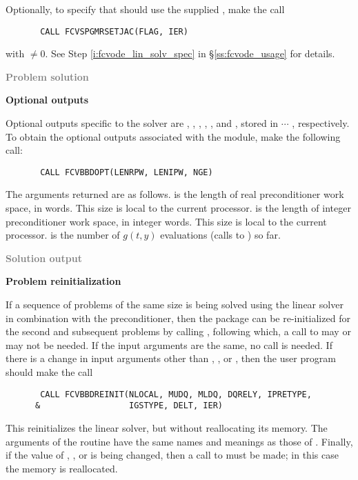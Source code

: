 \begin{Steps}
  Optionally, to specify that {\spgmr} should use the supplied , 
  make the call
\begin{verbatim}
       CALL FCVSPGMRSETJAC(FLAG, IER)
\end{verbatim}
  with $\neq 0$. See Step \ref{i:fcvode_lin_solv_spec} in 
  \S\ref{ss:fcvode_usage} for details.
  
\item \textcolor{gray}{\bf Problem solution}
  
\item {\bf {\cvbbdpre} Optional outputs}
  
  Optional outputs specific to the {\spgmr} solver are , , , 
  , , and , stored in  $\cdots$ , 
  respectively.
  To obtain the optional outputs associated with the {\cvbbdpre} module, make
  the following call:
\begin{verbatim}
       CALL FCVBBDOPT(LENRPW, LENIPW, NGE)
\end{verbatim}
  The arguments returned are as follows.
   is the length of real preconditioner work space, in  words.
  This size is local to the current processor.
   is the length of integer preconditioner work space, in integer words.
  This size is local to the current processor.
   is the number of $g(t,y)$ evaluations (calls to ) so far.
  
\item \textcolor{gray}{\bf Solution output}
  
\item {\bf Problem reinitialization}
  
  If a sequence of problems of the same size is being solved using the {\spgmr}
  linear solver in combination with the {\cvbbdpre} preconditioner, then the
  {\cvode} package can be re-initialized for the second and subsequent problems
  by calling , following which, a call to  may or 
  may not be needed.
  If the input arguments are the same, no  call is needed.
  If there is a change in input arguments other than , , or , 
  then the user program should make the call 
\begin{verbatim}
       CALL FCVBBDREINIT(NLOCAL, MUDQ, MLDQ, DQRELY, IPRETYPE, 
      &                  IGSTYPE, DELT, IER)
\end{verbatim}
  This reinitializes the {\spgmr} linear solver, but without reallocating its memory.  
  The arguments of the  routine have the same names and meanings as 
  those of .
  Finally, if the value of , , or  is being changed, then a call to 
   must be made; in this case the {\spgmr} memory is reallocated.
  

\end{Steps}

